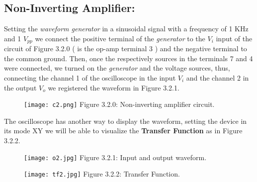 \subsection{Non-Inverting Amplifier:}

Setting the {\itshape waveform generator} in a sinusoidal signal with a frequency of 1 KHz and 1 $V_{pp}$ we connect the positive terminal of the {\itshape generator} to the $V_{i}$ input of the circuit of Figure 3.2.0 ( is the op-amp terminal 3 ) \linebreak and the negative terminal to the common ground. Then, once the respectively sources in the terminals 7 and 4 were connected, we turned on the {\itshape generator} and the voltage sources, thus, connecting the channel 1 of the oscilloscope in the input $V_{i}$ and the channel 2 in the output $V_{o}$ we registered the waveform in Figure 3.2.1. \hfill \break

\begin{figure}[H]
\texttt{[image: c2.png]}
\centering \linebreak \linebreak Figure 3.2.0: Non-inverting amplifier circuit.
\end{figure} \hfill

The oscilloscope has another way to display the waveform, setting the device in its mode XY we will be able to visualize the {\bfseries Transfer Function} as in Figure 3.2.2. \hfill \break

\begin{multicols}{2}
\begin{figure}[H]
\texttt{[image: o2.jpg]}
\centering \linebreak \linebreak Figure 3.2.1: Input and output waveform.
\end{figure}

\begin{figure}[H]
\texttt{[image: tf2.jpg]}
\centering \linebreak \linebreak Figure 3.2.2: Transfer Function.
\end{figure}
\end{multicols} \hfill

{\bfseries\itshape\color{carmine}{Observation:}} {\itshape\color{carmine}{The yellow waveform corresponds to the channel 1 and the blue waveform to channel 2 for Figure 3.2.1.}} \hfill \break


